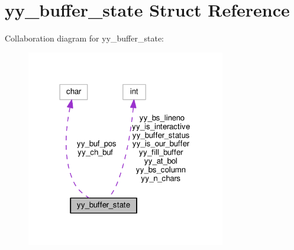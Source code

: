 \hypertarget{structyy__buffer__state}{}\section{yy\+\_\+buffer\+\_\+state Struct Reference}
\label{structyy__buffer__state}


Collaboration diagram for yy\+\_\+buffer\+\_\+state\+:
\nopagebreak
\begin{figure}[H]
\begin{center}
\leavevmode
\includegraphics[width=246pt]{structyy__buffer__state__coll__graph}
\end{center}
\end{figure}
